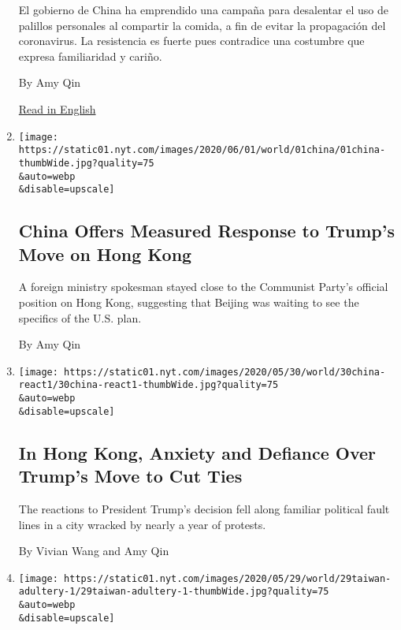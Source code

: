 \begin{enumerate}
  El gobierno de China ha emprendido una campaña para desalentar el uso
  de palillos personales al compartir la comida, a fin de evitar la
  propagación del coronavirus. La resistencia es fuerte pues contradice
  una costumbre que expresa familiaridad y cariño.

  By Amy Qin

  \href{https://www.nytimes.com/2020/05/25/world/asia/china-coronavirus-chopsticks.html}{Read
  in English}
\item
  \href{/2020/06/01/world/asia/china-trump-hong-kong.html}{}

  \texttt{[image: https://static01.nyt.com/images/2020/06/01/world/01china/01china-thumbWide.jpg?quality=75\\\&auto=webp\\\&disable=upscale]}

  \hypertarget{china-offers-measured-response-to-trumps-move-on-hong-kong}{%
  \subsection{China Offers Measured Response to Trump's Move on Hong
  Kong}\label{china-offers-measured-response-to-trumps-move-on-hong-kong}}

  A foreign ministry spokesman stayed close to the Communist Party's
  official position on Hong Kong, suggesting that Beijing was waiting to
  see the specifics of the U.S. plan.

  By Amy Qin
\item
  \href{/2020/05/30/world/asia/hong-kong-trump-china.html}{}

  \texttt{[image: https://static01.nyt.com/images/2020/05/30/world/30china-react1/30china-react1-thumbWide.jpg?quality=75\\\&auto=webp\\\&disable=upscale]}

  \hypertarget{in-hong-kong-anxiety-and-defiance-over-trumps-move-to-cut-ties}{%
  \subsection{In Hong Kong, Anxiety and Defiance Over Trump's Move to
  Cut
  Ties}\label{in-hong-kong-anxiety-and-defiance-over-trumps-move-to-cut-ties}}

  The reactions to President Trump's decision fell along familiar
  political fault lines in a city wracked by nearly a year of protests.

  By Vivian Wang and Amy Qin
\item
  \href{/2020/05/29/world/asia/taiwan-adultery.html}{}

  \texttt{[image: https://static01.nyt.com/images/2020/05/29/world/29taiwan-adultery-1/29taiwan-adultery-1-thumbWide.jpg?quality=75\\\&auto=webp\\\&disable=upscale]}


\end{enumerate}
